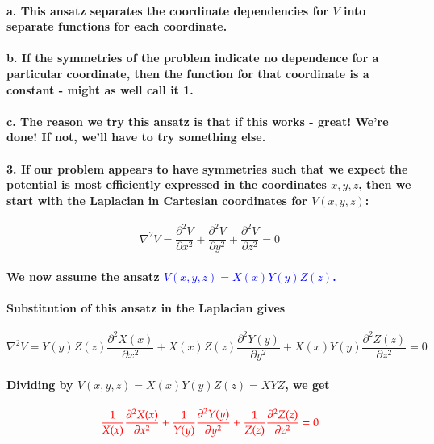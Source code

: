 \documentclass{article}
\begin{document}
\paragraph{\indent a. This ansatz separates the coordinate dependencies for $V$ into separate functions for each coordinate.}
\paragraph{\indent b. If the symmetries of the problem indicate no dependence for a particular coordinate, then the function for that coordinate is a constant - might as well call it 1.}
\paragraph{\indent c. The reason we try this ansatz is that if this works - great! We're done! If not, we'll have to try something else.}
\paragraph{3. If our problem appears to have symmetries such that we expect the potential is most efficiently expressed in the coordinates $x,y,z$, then we start with the Laplacian in Cartesian coordinates for $V(x,y,z)$:}
\begin{equation*}
    \nabla^2V=\frac{\partial^2 V}{\partial x^2}+\frac{\partial^2 V}{\partial y^2}+\frac{\partial^2 V}{\partial z^2}=0
\end{equation*}
\paragraph{We now assume the ansatz \textcolor{blue}{$V(x,y,z)=X(x)Y(y)Z(z)$.}}
\paragraph{Substitution of this ansatz in the Laplacian gives}
\begin{equation*}
    \nabla^2V=Y(y)Z(z)\frac{\partial^2X(x)}{\partial x^2}+X(x)Z(z)\frac{\partial^2Y(y)}{\partial y^2}+X(x)Y(y)\frac{\partial^2Z(z)}{\partial z^2}=0
\end{equation*}
\paragraph{Dividing by $V(x,y,z)=X(x)Y(y)Z(z)=XYZ$, we get}
\begin{equation*}
    \textcolor{red}{\frac{1}{X(x)}\frac{\partial^2X(x)}{\partial x^2}+\frac{1}{Y(y)}\frac{\partial^2Y(y)}{\partial y^2}+\frac{1}{Z(z)}\frac{\partial^2Z(z)}{\partial z^2}=0}
\end{equation*}
\end{document}
